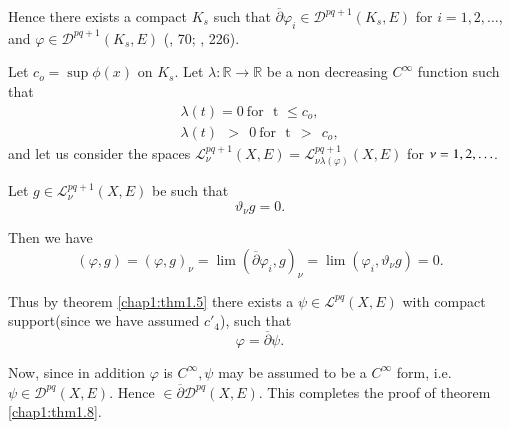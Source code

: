 Hence there exists a compact $K_s$ such that
$\overline{\partial}\varphi_{i} \in \mathscr{D}^{pq+1}(K_{s},E)$ for $i
= 1,2, \ldots$, and $\varphi \in \mathscr{D}^{pq+1}(K_{s},E)$
(\cite{key8}, 70; \cite{key19}, 226). 

Let $c_o= \sup \phi (x)$ on $K_s$. Let $\lambda: \mathbb{R} \rightarrow
\mathbb{R}$ be a non decreasing $C^{\infty}$ function such that 
\begin{gather*}
\lambda(t) = 0 ~ \text{for ~t } \leqslant c_o,\\
\lambda(t) ~~ > ~~ 0  ~\text{for ~t} ~~ >  ~~c_o ,
\end{gather*}
and let us consider the spaces $\mathcal{L}^{pq+1}_{\nu}(X,E)=
\mathcal{L}^{pq+1}_{\nu \lambda(\varphi)}(X,E)$ for $\nu =\break 1,2,\ldots$. 

Let $g\in \mathcal{L}^{pq+1}_{\nu}(X,E)$ be such that
$$
\vartheta_{\nu}{g} = 0. 
$$

Then we have 
$$
(\varphi, g) = (\varphi, g)_\nu =
\lim(\overline{\partial}\varphi_{i},g)_{\nu} =
\lim(\varphi_{i},\vartheta_{\nu} g) = 0.  
$$

Thus by theorem \ref{chap1:thm1.5} there exists a $\psi \in \mathcal{L}^{pq}(X,E)$
with compact support\pageoriginale (since we have assumed
$c'_{4}$), such that 
$$
\varphi = \overline{\partial}\psi.
$$

Now, since in addition $\varphi$ is $C^{\infty}, \psi$ may be assumed
to be a $C^{\infty}$ form, i.e. $\psi \in\mathscr{D}^{pq}(X,E)$. Hence
$\in \overline{\partial}\mathscr{D}^{pq}(X,E)$. This completes the
proof of theorem \ref{chap1:thm1.8}.  

